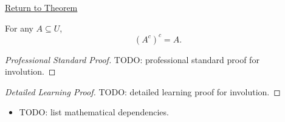 \newpage
{}
\label{prf:involution}

\begin{remark*}[Return]
\hyperref[thm:involution]{Return to Theorem}
\end{remark*}

\begin{theorem*}
For any $A \subseteq U$,
\[
(A^c)^c = A.
\]
\end{theorem*}

\begin{proof}[Professional Standard Proof]
\LRAProofBodyStart
TODO: professional standard proof for involution.
\end{proof}

\begin{proof}[Detailed Learning Proof]
\LRAProofBodyStart
TODO: detailed learning proof for involution.
\end{proof}

\begin{remark*}
\end{remark*}

\begin{dependencies}
\begin{itemize}
  \item TODO: list mathematical dependencies.
\end{itemize}
\end{dependencies}

\clearpage
